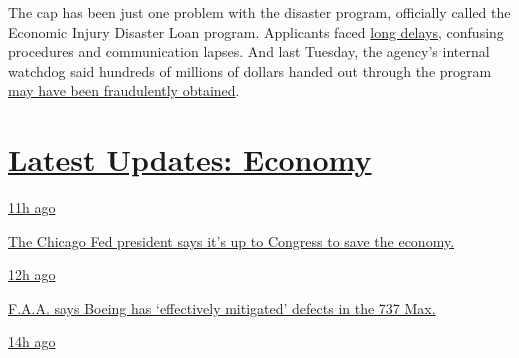 The cap has been just one problem with the disaster program, officially
called the Economic Injury Disaster Loan program. Applicants faced
\href{https://www.nytimes.com/2020/04/09/business/smallbusiness/small-business-disaster-loans-coronavirus.html}{long
delays}, confusing procedures and communication lapses. And last
Tuesday, the agency's internal watchdog said hundreds of millions of
dollars handed out through the program
\href{https://www.nytimes.com/live/2020/07/28/business/stock-market-today-coronavirus\#thieves-are-targeting-small-business-relief-programs-a-watchdog-says}{may
have been fraudulently obtained}.

\hypertarget{latest-updates-economy}{%
\section{\texorpdfstring{\href{https://www.nytimes.com/live/2020/08/03/business/stock-market-today-coronavirus?action=click\&pgtype=Article\&state=default\&region=MAIN_CONTENT_1\&context=storylines_live_updates}{Latest
Updates:
Economy}}{Latest Updates: Economy}}\label{latest-updates-economy}}

\href{https://www.nytimes.com/live/2020/08/03/business/stock-market-today-coronavirus?action=click\&pgtype=Article\&state=default\&region=MAIN_CONTENT_1\&context=storylines_live_updates\#the-chicago-fed-president-says-its-up-to-congress-to-save-the-economy}{11h
ago}

\href{https://www.nytimes.com/live/2020/08/03/business/stock-market-today-coronavirus?action=click\&pgtype=Article\&state=default\&region=MAIN_CONTENT_1\&context=storylines_live_updates\#the-chicago-fed-president-says-its-up-to-congress-to-save-the-economy}{The
Chicago Fed president says it's up to Congress to save the economy.}

\href{https://www.nytimes.com/live/2020/08/03/business/stock-market-today-coronavirus?action=click\&pgtype=Article\&state=default\&region=MAIN_CONTENT_1\&context=storylines_live_updates\#faa-says-boeing-has-effectively-mitigated-defects-in-the-737-max}{12h
ago}

\href{https://www.nytimes.com/live/2020/08/03/business/stock-market-today-coronavirus?action=click\&pgtype=Article\&state=default\&region=MAIN_CONTENT_1\&context=storylines_live_updates\#faa-says-boeing-has-effectively-mitigated-defects-in-the-737-max}{F.A.A.
says Boeing has `effectively mitigated' defects in the 737 Max.}

\href{https://www.nytimes.com/live/2020/08/03/business/stock-market-today-coronavirus?action=click\&pgtype=Article\&state=default\&region=MAIN_CONTENT_1\&context=storylines_live_updates\#small-businesses-got-emergency-loans-but-not-what-they-expected}{14h
ago}

